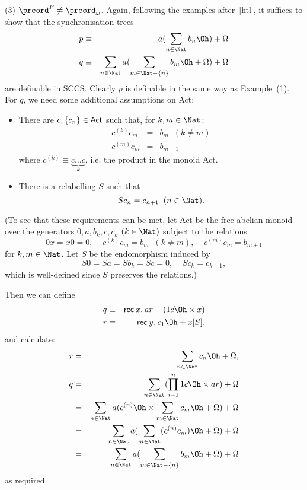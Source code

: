 \noindent (3) ${\preord^{F}} \not= {\preord_{\omega}}$. Again, following the examples after~\ref{htl}, it suffices to show that the synchronisation trees
\begin{eqnarray*}
p & \equiv & a(\sum_{n \in \Nat} b_{n}\Oh ) + \Omega \\
q & \equiv & {\sum_{n \in \Nat} a({\sum_{m \in \Nat - \{ n \}} b_{m} \Oh} + \Omega )} + \Omega
\end{eqnarray*}
are definable in  SCCS.
Clearly $p$ is definable in the same way as Example~(1).
For $q$, we need some additional assumptions on {\sf Act}:
\begin{itemize}
\item There are $c, \{ c_{n} \} \in {\sf Act}$ such that,
for $k, m \in \Nat$:
\begin{eqnarray*}
c^{(k)} c_{m} & = & b_{m} \;\; (k \not= m) \\
c^{(m)} c_{m} & = & b_{m + 1} 
\end{eqnarray*}
where $c^{(k)} \equiv \underbrace{c \ldots c}_{k}$, i.e. the product in the monoid {\sf Act}.
\item There is a relabelling $S$ such that
\[ S c_{n} = c_{n + 1} \;\; (n \in \Nat ). \]
\end{itemize}
(To see that these requirements can be met, let {\sf Act} be the free abelian
monoid over the generators $0, a, b_{k}, c, c_{k}$ $(k \in \Nat)$ subject
to the relations
\[ 0x = x0 = 0, \;\;\;\; c^{(k)}c_{m} = b_{m} \;\;(k \not= m), \;\;\;\; c^{(m)}c_{m} = b_{m+1} \]
for $k, m \in \Nat$.
Let $S$ be the endomorphism induced by
\[ S 0 = S a = S b_{k} = S c = 0, \;\;\;\; S c_{k} = c_{k+1} , \]
which is well-defined since $S$ preserves the relations.)

Then we can define
\begin{eqnarray*}
q & \equiv & {\sf rec} \: x. \: ar + (1 c \Oh \times x) \\
r & \equiv & {\sf rec} \: y. \: c_{1} \Oh + x[S] ,
\end{eqnarray*}
and calculate:
\begin{eqnarray*}
r & = & {\sum_{n \in \Nat} c_{n} \Oh } + \Omega , \\
q & = & {\sum_{n \in \Nat} ( \prod_{i=1}^{n} 1 c \Oh \times ar) } + \Omega \\
& = & {\sum_{n \in \Nat} a(c^{(n)} \Oh \times \sum_{m \in \Nat} c_{m} \Oh + \Omega )} + \Omega \\
& = & {\sum_{n \in \Nat} a( \sum_{m \in \Nat} (c^{(n)} c_{m}) \Oh + \Omega )} + \Omega \\
& = &  {\sum_{n \in \Nat} a( \sum_{m \in \Nat - \{ n \}} b_{m} \Oh + \Omega )} + \Omega 
\end{eqnarray*}
as required.

